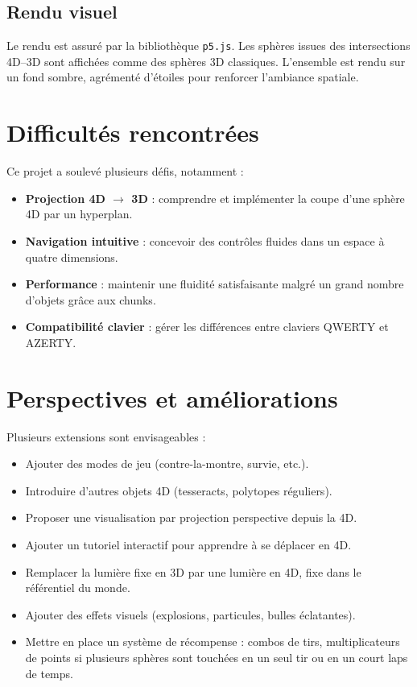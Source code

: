 \documentclass[11pt,a4paper]{article}
\begin{document}
\subsection{Rendu visuel}

Le rendu est assuré par la bibliothèque \texttt{p5.js}. Les sphères issues des intersections 4D–3D sont affichées comme des sphères 3D classiques. L’ensemble est rendu sur un fond sombre, agrémenté d’étoiles pour renforcer l’ambiance spatiale.

\section{Difficultés rencontrées}

Ce projet a soulevé plusieurs défis, notamment :
\begin{itemize}
	\item \textbf{Projection 4D $\rightarrow$ 3D} : comprendre et implémenter la coupe d’une sphère 4D par un hyperplan.
	\item \textbf{Navigation intuitive} : concevoir des contrôles fluides dans un espace à quatre dimensions.
	\item \textbf{Performance} : maintenir une fluidité satisfaisante malgré un grand nombre d’objets grâce aux chunks.
	\item \textbf{Compatibilité clavier} : gérer les différences entre claviers QWERTY et AZERTY.
\end{itemize}

\section{Perspectives et améliorations}

Plusieurs extensions sont envisageables :
\begin{itemize}
	\item Ajouter des modes de jeu (contre-la-montre, survie, etc.).
	\item Introduire d’autres objets 4D (tesseracts, polytopes réguliers).
	\item Proposer une visualisation par projection perspective depuis la 4D.
	\item Ajouter un tutoriel interactif pour apprendre à se déplacer en 4D.
	\item Remplacer la lumière fixe en 3D par une lumière en 4D, fixe dans le référentiel du monde.
	\item Ajouter des effets visuels (explosions, particules, bulles éclatantes).
	\item Mettre en place un système de récompense : combos de tirs, multiplicateurs de points si plusieurs sphères sont touchées en un seul tir ou en un court laps de temps.
\end{itemize}
\end{document}
